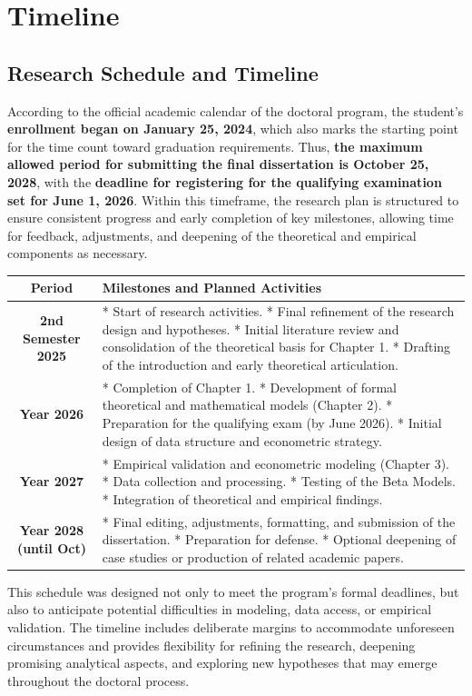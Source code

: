 
\section{Timeline}

\subsection{Research Schedule and Timeline}

According to the official academic calendar of the doctoral program, the student’s \textbf{enrollment began on January 25, 2024}, which also marks the starting point for the time count toward graduation requirements. Thus, \textbf{the maximum allowed period for submitting the final dissertation is October 25, 2028}, with the \textbf{deadline for registering for the qualifying examination set for June 1, 2026}. Within this timeframe, the research plan is structured to ensure consistent progress and early completion of key milestones, allowing time for feedback, adjustments, and deepening of the theoretical and empirical components as necessary.

\begin{table}[H]
\centering
\label{tab:timeline}
\renewcommand{\arraystretch}{1.3}
\footnotesize
\begin{tabularx}{\textwidth}{|c|X|}
\hline
\textbf{Period} & \textbf{Milestones and Planned Activities} \\
\hline
\textbf{2nd Semester 2025} & * Start of research activities. * Final refinement of the research design and hypotheses. * Initial literature review and consolidation of the theoretical basis for Chapter 1. * Drafting of the introduction and early theoretical articulation. \\
\hline
\textbf{Year 2026} & * Completion of Chapter 1. * Development of formal theoretical and mathematical models (Chapter 2). * Preparation for the qualifying exam (by June 2026). * Initial design of data structure and econometric strategy. \\
\hline
\textbf{Year 2027} & * Empirical validation and econometric modeling (Chapter 3). * Data collection and processing. * Testing of the Beta Models. * Integration of theoretical and empirical findings. \\
\hline
\textbf{Year 2028 (until Oct)} & * Final editing, adjustments, formatting, and submission of the dissertation. * Preparation for defense. * Optional deepening of case studies or production of related academic papers. \\
\hline
\end{tabularx}
\end{table}

This schedule was designed not only to meet the program's formal deadlines, but also to anticipate potential difficulties in modeling, data access, or empirical validation. The timeline includes deliberate margins to accommodate unforeseen circumstances and provides flexibility for refining the research, deepening promising analytical aspects, and exploring new hypotheses that may emerge throughout the doctoral process.

\newpage

